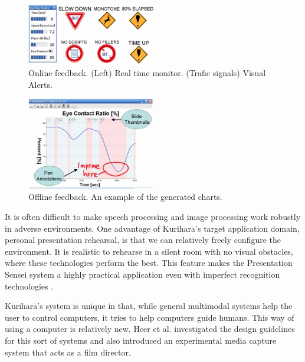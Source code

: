 \begin{figure}[htbp]
  \centering\includegraphics[width=0.5\textwidth]{./img/onlinefeedback.png}
  \caption[Online feedback of presentation sensei]{Online feedback. (Left) Real time monitor. (Trafic signals) Visual Alerts.\cite{Kurihara2007}}\label{fig:onlinefeedback}
\end{figure}

\begin{figure}[htbp]
  \centering\includegraphics[width=0.5\textwidth]{./img/offlinefeedback.png}
  \caption[Offline feedback of presentation sensei]{Offline feedback. An example of the generated charts\cite{Kurihara2007}.}\label{fig:offlinefeedback}
\end{figure}

\par It is often difficult to make speech processing and image processing work robustly in adverse environments. One advantage of Kurihara's target application domain, personal presentation rehearsal, is that we can relatively freely configure the environment. It is realistic to rehearse in a silent room with no visual obstacles, where these technologies perform the best. This feature makes the Presentation Sensei system a highly practical application even with imperfect recognition technologies \cite{Kurihara2007}.
\par Kurihara's system is unique in that, while general multimodal systems help the user to control computers, it tries to help computers guide humans. This way of using a computer is relatively new. Heer et al. \cite{Heer} investigated the design guidelines for this sort of systems and also introduced an experimental media capture system that acts as a film director. 
